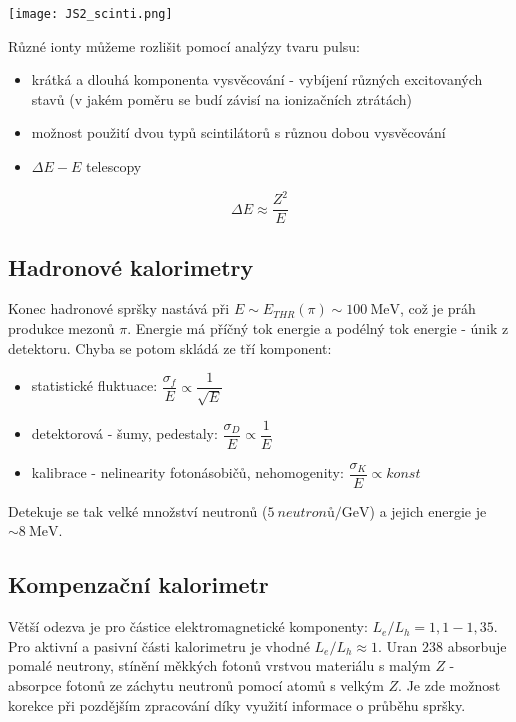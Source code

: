 \documentclass[../../main.tex]{subfiles}
\begin{document}
\begin{center}
	\texttt{[image: JS2\_scinti.png]}
\end{center}

Různé ionty můžeme rozlišit pomocí analýzy tvaru pulsu:
\begin{itemize}
	\item krátká a dlouhá komponenta vysvěcování - vybíjení různých excitovaných stavů (v jakém poměru se budí závisí na ionizačních ztrátách)
	\item možnost použití dvou typů scintilátorů s různou dobou vysvěcování
	\item $\Delta E - E$ telescopy
\end{itemize}
\begin{equation}
\Delta E \approx \dfrac{Z^2}{E}
\end{equation}

\subsection{Hadronové kalorimetry}

Konec hadronové spršky nastává při $E \sim E_{THR} (\pi) \sim 100 ~\mathrm{MeV}$, což je práh produkce mezonů $\pi$. Energie má příčný tok energie a podélný tok energie - únik z detektoru. Chyba se potom skládá ze tří komponent:
\begin{itemize}
	\item statistické fluktuace: $\dfrac{\sigma _f}{E} \propto \dfrac{1}{\sqrt{E}}$
	\item detektorová - šumy, pedestaly: $\dfrac{\sigma _D}{E} \propto \dfrac{1}{E}$
	\item kalibrace - nelinearity fotonásobičů, nehomogenity: $\dfrac{\sigma _K}{E} \propto konst$
\end{itemize}

Detekuje se tak velké množství neutronů ($5\:neutronů/\mathrm{GeV}$) a jejich energie je $\sim 8 ~\mathrm{MeV}$.

\subsection{Kompenzační kalorimetr}

Větší odezva je pro částice elektromagnetické komponenty: $L_e/L_h = 1,1 - 1,35$. Pro aktivní a pasivní části kalorimetru je vhodné $L_e /L_h \approx 1$. Uran $238$ absorbuje pomalé neutrony, stínění měkkých fotonů vrstvou materiálu s malým $Z$ - absorpce fotonů ze záchytu neutronů pomocí atomů s velkým $Z$. Je zde možnost korekce při pozdějším zpracování díky využití informace o průběhu spršky. 
\end{document}

